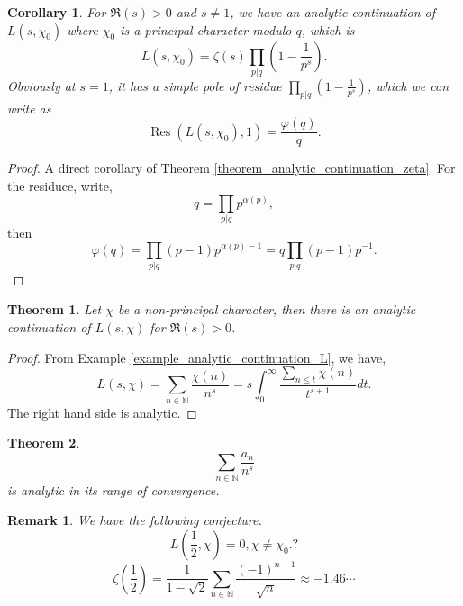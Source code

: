 \documentclass{article}
\newtheorem{theorem}{Theorem} [section]
\newtheorem{remark}{Remark}[section]
\newtheorem{corollary}{Corollary} [section]
\DeclareMathOperator{\Res}{Res}
\newcommand{\N}[0]{\mathbb{N}}
\begin{document}
\begin{corollary}
  For $\Re(s)>0$ and $s\not=1$, we have an analytic continuation of $L(s,\chi_0)$ where $\chi_0$ is a principal character modulo $q$, which is 
  \begin{equation*}
    L(s,\chi_0) = \zeta(s)\prod_{p|q}\left(1-{\frac 1 {p^s}}\right).
  \end{equation*}
  Obviously at $s=1$, it has a simple pole of residue $\prod_{p|q}\left(1-{\frac 1 {p^s}}\right)$, which we can write as 
  \begin{equation*}
    \Res(L(s,\chi_0),1) = {\frac {\varphi(q)} q}.
  \end{equation*}
  \label{corollary_analytic_continuation_principal_character}
\end{corollary}

\begin{proof}
  A direct corollary of Theorem \ref{theorem_analytic_continuation_zeta}. For the residuce, write,
  \begin{equation*}
    q = \prod_{p|q}p^{\alpha(p)},
  \end{equation*}
  then
  \begin{equation*}
    \varphi(q) = \prod_{p|q}(p-1)p^{\alpha(p)-1} = q\prod_{p|q}(p-1)p^{-1}.
  \end{equation*}
\end{proof}
 
\begin{theorem}
  \label{theorem_analytic_continuation_L_chi}
  Let $\chi$ be a non-principal character, then there is an analytic continuation of $L(s,\chi)$ for $\Re(s)>0$.
\end{theorem}

\begin{proof}
  From Example \ref{example_analytic_continuation_L}, we have,
  \begin{equation*}
    L(s,\chi) = \sum_{n\in\N}{\frac {\chi(n)} {n^s}} = s\int_0^\infty {\frac {\sum_{n\leq t}\chi(n)} {t^{s+1}}}dt.
  \end{equation*}
  The right hand side is analytic. 
\end{proof}

\begin{theorem}
    \begin{equation*}
      \sum_{n\in\N}{\frac {a_n} {n^s}}
    \end{equation*}
    is analytic in its range of convergence. 
\end{theorem}

\begin{remark}
  We have the following conjecture.
    \begin{equation*}
    L\left({\frac 1 2}, \chi\right) = 0, \chi\not=\chi_0.?
  \end{equation*}
  \begin{equation*}
    \zeta\left({\frac 1 2}\right)={\frac 1 {1-\sqrt{2}}}\sum_{n\in\N}{\frac {(-1)^{n-1}} {\sqrt{n}}}\approx -1.46\cdots
  \end{equation*}
\end{remark}
\end{document}
